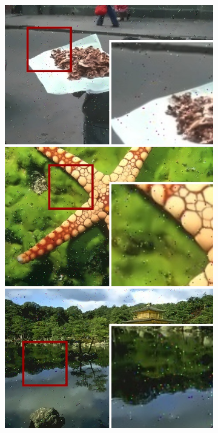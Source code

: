 \begin{figure}[!ht]
\begin{subfigure}[]{0.22\textwidth}
    \includegraphics[width=\textwidth]{./figures/sensor/berkeley/90076_nonlocalmeans_frame.jpg}\vspace{0.1cm}\\
    \includegraphics[width=\textwidth]{./figures/sensor/berkeley/12003_nonlocalmeans_frame.jpg}\vspace{0.1cm}\\
    \includegraphics[width=\textwidth]{./figures/sensor/berkeley/65010_nonlocalmeans_frame.jpg}\vspace{0.1cm}\\

\end{subfigure}
\end{figure}
